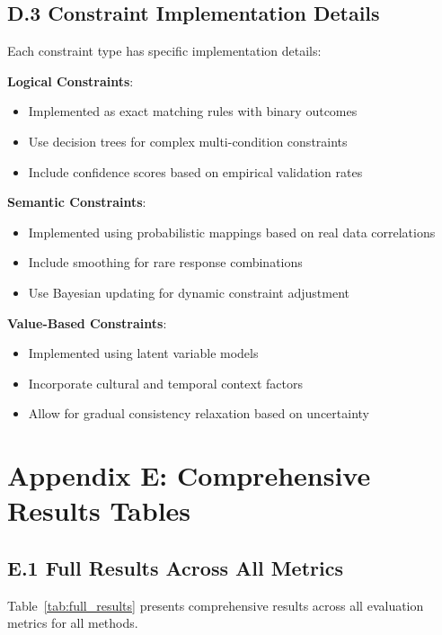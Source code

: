 \documentclass[sigconf, anonymous]{acmart}
\begin{document}
\subsection*{D.3 Constraint Implementation Details}

Each constraint type has specific implementation details:

\textbf{Logical Constraints}:
\begin{itemize}
    \item Implemented as exact matching rules with binary outcomes
    \item Use decision trees for complex multi-condition constraints
    \item Include confidence scores based on empirical validation rates
\end{itemize}

\textbf{Semantic Constraints}:
\begin{itemize}
    \item Implemented using probabilistic mappings based on real data correlations
    \item Include smoothing for rare response combinations
    \item Use Bayesian updating for dynamic constraint adjustment
\end{itemize}

\textbf{Value-Based Constraints}:
\begin{itemize}
    \item Implemented using latent variable models
    \item Incorporate cultural and temporal context factors
    \item Allow for gradual consistency relaxation based on uncertainty
\end{itemize}

\newpage
\section*{Appendix E: Comprehensive Results Tables}

\subsection*{E.1 Full Results Across All Metrics}

Table~\ref{tab:full_results} presents comprehensive results across all evaluation metrics for all methods.
\end{document}
